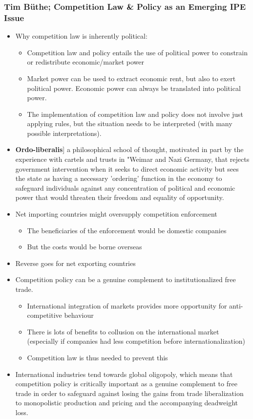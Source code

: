 \documentclass[11pt]{article}
\begin{document}
\subsubsection{Tim Büthe; Competition Law \& Policy as an Emerging IPE Issue}
\label{sec:orga134f4d}
\begin{itemize}
\item Why competition law is inherently political:
\begin{itemize}
\item Competition law and policy entails the use of political power to constrain
or redistribute economic/market power
\item Market power can be used to extract economic rent, but also to exert
political power. Economic power can always be translated into political
power.
\item The implementation of competition law and policy does not involve just
applying rules, but the situation needs to be interpreted (with many
possible interpretations).
\end{itemize}
\item \textbf{Ordo-liberalis}] a philosophical school of thought, motivated in part by the
experience with cartels and trusts in "Weimar and Nazi Germany, that rejects
government intervention when it seeks to direct economic activity but sees the
state as having a necessary 'ordering' function in the economy to safeguard
individuals against any concentration of political and economic power that
would threaten their freedom and equality of opportunity.
\item Net importing countries might oversupply competition enforcement
\begin{itemize}
\item The beneficiaries of the enforcement would be domestic companies
\item But the costs would be borne overseas
\end{itemize}
\item Reverse goes for net exporting countries
\item Competition policy can be a genuine complement to institutionalized free
trade.
\begin{itemize}
\item International integration of markets provides more opportunity for
anti-competitive behaviour
\item There is lots of benefits to collusion on the international market
(especially if companies had less competition before internationalization)
\item Competition law is thus needed to prevent this
\end{itemize}
\item International industries tend towards global oligopoly, which means that
competition policy is critically important as a genuine complement to free
trade in order to safeguard against losing the gains from trade liberalization
to monopolistic production and pricing and the accompanying deadweight loss.
\end{itemize}
\end{document}
